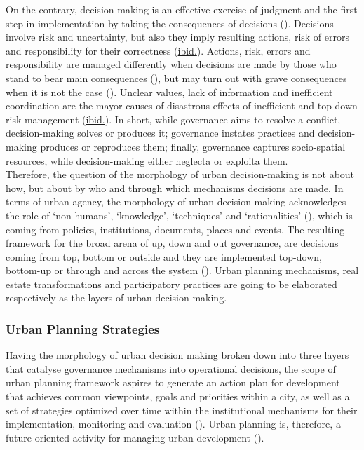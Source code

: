 \documentclass[11pt]{report}
\begin{document}
On the contrary, decision-making is an effective exercise of judgment and the first step in implementation by taking the consequences of decisions (\href{Knight}{\citealt{Knight 1964}}).
Decisions involve risk and uncertainty, but also they imply resulting actions, risk of errors and responsibility for their correctness (\href{Knight}{ibid.}).
Actions, risk, errors and responsibility are managed differently when decisions are made by those who stand to bear main consequences (\href{Meppem}{\cite{Meppem and Gill, 1998 ????}}), but may turn out with grave consequences when it is not the case (\href{Friend}{\citealt{Friend_Planning_2005}}).  Unclear values, lack of information and inefficient coordination are the mayor causes of disastrous effects of inefficient and top-down risk management (\href{Friend}{ibid.}).
In short, while governance aims to resolve a conflict, decision-making solves or produces it; governance instates practices and decision-making produces or reproduces them; finally, governance captures socio-spatial resources, while decision-making either neglecta or exploita them.
\\

Therefore, the question of the morphology of urban decision-making is not about how, but about by who and through which mechanisms decisions are made.
In terms of urban agency, the morphology of urban decision-making acknowledges the role of ‘non-humans’, ‘knowledge’, ‘techniques’ and ‘rationalities’ (\href{Healey}{\cite{Healey 2013}}), which is coming from policies, institutions, documents, places and events.
The resulting framework for the broad arena of up, down and out governance, are decisions coming from top, bottom or outside and they are implemented top-down, bottom-up or through and across the system
(\href{Hudson}{\cite{Hudson and Leftwich 2014}}).
Urban planning mechanisms, real estate transformations and participatory practices are going to be elaborated respectively as the layers of urban decision-making.

\subsubsection{Urban Planning Strategies}

Having the morphology of urban decision making broken down into three layers that catalyse governance mechanisms into operational decisions, the scope of urban  planning  framework aspires  to  generate  an  action  plan  for  development  that  achieves  common viewpoints,  goals  and  priorities  within  a city,  as  well  as  a  set  of  strategies  optimized  over  time  within  the institutional mechanisms for their implementation, monitoring and evaluation (\href{Fisher}{\citealt{fisher_building_2001}}).
Urban planning is, therefore, a future-oriented activity for managing urban development (\href{Nedovic}{\citealt{Nedovic-Budic_Mornings_2011}}). 
\\
\end{document}
